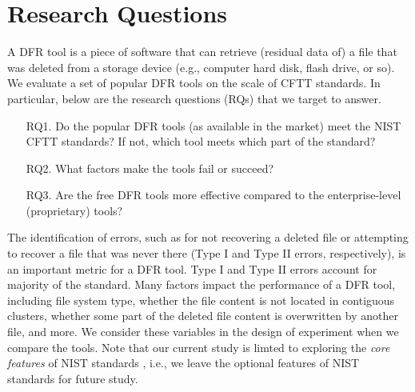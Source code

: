 \section{Research Questions}

A DFR tool is a piece of software that can retrieve (residual data of) a file that was deleted 
from a storage device (e.g., computer hard disk, flash drive, or so). We evaluate a set of 
popular DFR tools on the scale of CFTT standards. 
In particular, below are the research questions (RQs) that we target to answer. 

\begin{itemize}
\item[RQ1.] Do the popular DFR tools (as available in the market) meet the NIST CFTT standards? 
If not, which tool meets which part of the standard? 

\item[RQ2.] What factors make the tools fail or succeed?

\item[RQ3.] Are the free DFR tools more effective compared to the enterprise-level (proprietary) tools?
\end{itemize}

The identification of errors, such as for not recovering a deleted file or attempting to recover a file that was never there 
(Type I and Type II errors, respectively), is an important metric for a DFR tool. 
Type I and Type II errors account for majority of the standard. Many factors impact the performance of a DFR tool, 
including file system type, whether the file content is not located in contiguous clusters, whether 
some part of the deleted file content is overwritten by another file, and more.
We consider these variables in the design of experiment when we compare the tools.
Note that our current study is limted to exploring the \emph{core features} of NIST standards \cite{cftt:nist}, 
i.e., we leave the optional features \cite{cftt:nist} of NIST standards for future study.

